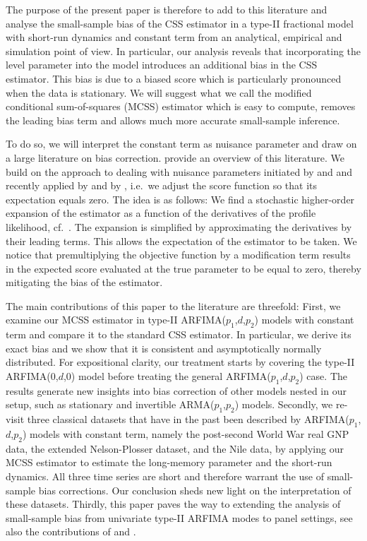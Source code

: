 {{The purpose of the present paper is therefore to add to this literature and analyse the small-sample bias of the CSS estimator in a type-II fractional model with short-run dynamics and constant term from an analytical, empirical
and simulation point of view. In particular, our analysis reveals that incorporating the level parameter into the model introduces an additional bias in the CSS estimator. This bias is due to a biased score which is particularly
pronounced when the data is stationary. We will suggest what we call the modified conditional sum-of-squares (MCSS) estimator which is easy to compute, removes the leading bias term and allows much more accurate small-sample
inference.

To do so, we will interpret the constant term as nuisance parameter and draw on a large literature on bias correction. \textcite{laskar1998modified} provide an overview of this literature. We build on the
approach to dealing with nuisance parameters initiated by \textcite{conniffe1987expected} and \textcite{mccullagh1990simple} and recently applied by \textcite{bartolucci2016modified} and by \textcite{martellosio2020adjusted}, i.e.\ we adjust the
score function so that its expectation equals zero. The idea is as follows: We find a stochastic higher-order expansion of the estimator as a function of the derivatives of the profile likelihood, cf.\ \textcite{johansen2016role,lawley1956general}. The expansion is simplified by
approximating the derivatives by their leading terms. This allows the expectation of the estimator to be taken. We notice that premultiplying the objective function by a modification term results in the expected score evaluated at
the true parameter to be equal to zero, thereby mitigating the bias of the estimator.

The main contributions of this paper to the literature are threefold: First, we examine our MCSS estimator in type-II ARFIMA($p_1$,$d$,$p_2$) models with constant term and compare it to the standard CSS estimator. In particular,
we derive its exact bias and we show that it is consistent and asymptotically normally distributed. For expositional clarity, our treatment starts by covering the type-II ARFIMA(0,$d$,0) model before treating the general
ARFIMA($p_1$,$d$,$p_2$) case. The results generate new insights into bias correction of other models nested in our setup, such as stationary and invertible ARMA($p_1$,$p_2$) models. Secondly, we re-visit three classical datasets
that have in the past been described by ARFIMA($p_1$,$d$,$p_2$) models with constant term, namely the post-second World War real GNP data, the extended Nelson-Plosser dataset, and the Nile data, by applying our MCSS estimator to
estimate the long-memory parameter and the short-run dynamics. All three time series are short and therefore warrant the use of small-sample bias corrections. Our conclusion sheds new light on the interpretation of these
datasets. Thirdly, this paper paves the way to extending the analysis of small-sample bias from univariate type-II ARFIMA modes to panel settings, see also the contributions of \textcite{robinson2015efficient} and
\textcite{schumann2023role}.

}}
